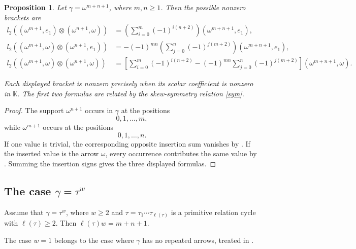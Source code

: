 \documentclass[11pt,a4paper,reqno]{amsart}
\newcommand{\mK}{\mathbb K}
\newcommand{\para}[2]{(#1,#2)}
\newcommand{\taue}{\tau_{\ell(\tau)}}
\theoremstyle{plain}
\newtheorem{proposition}[proposition]{Proposition}
\theoremstyle{definition}
\numberwithin{equation}{section}
\begin{document}
	\begin{proposition}
		\label{prop:higher-pure-loop-read-off}
		Let
		$\gamma=\omega^{m+n+1}$, where $m,n\geq1$.
		Then the possible nonzero brackets are
		\begin{align}
			l_2(
			\para{\omega^{m+1}}{e_1}
			\otimes
			\para{\omega^{n+1}}{\omega}
			)
			&=
			\left(
			\sum_{i=0}^{m}
			(-1)^{i(n+2)}
			\right)
			\para{\omega^{m+n+1}}{e_1},
			\label{eq:higher-loop-trivial-arrow}
			\\
			l_2(
			\para{\omega^{m+1}}{\omega}
			\otimes
			\para{\omega^{n+1}}{e_1}
			)
			&=
			-(-1)^{mn}
			\left(
			\sum_{j=0}^{n}
			(-1)^{j(m+2)}
			\right)
			\para{\omega^{m+n+1}}{e_1},
			\label{eq:higher-loop-arrow-trivial}
			\\
			l_2(
			\para{\omega^{m+1}}{\omega}
			\otimes
			\para{\omega^{n+1}}{\omega}
			)
			&=
			\left[
			\sum_{i=0}^{m}
			(-1)^{i(n+2)}
			-
			(-1)^{mn}
			\sum_{j=0}^{n}
			(-1)^{j(m+2)}
			\right]
			\para{\omega^{m+n+1}}{\omega}.
			\label{eq:higher-loop-arrow-arrow}
		\end{align}
		
		Each displayed bracket is nonzero precisely when its scalar coefficient is
		nonzero in $\mK$.  The first two formulas are related by the
		skew-symmetry relation \eqref{sym}.
	\end{proposition}
	
	\begin{proof}
		The support $\omega^{n+1}$ occurs in $\gamma$ at the positions
		\[
		0,1,\ldots,m,
		\]
		while $\omega^{m+1}$ occurs at the positions
		\[
		0,1,\ldots,n.
		\]
		If one value is trivial, the corresponding opposite insertion sum
		vanishes by .  If the inserted value is the
		arrow $\omega$, every occurrence contributes the same value by
		.  Summing the insertion signs gives the
		three displayed formulas.
	\end{proof}
	\subsection{The case \texorpdfstring{$\gamma=\tau^w$}{gamma = tau power w}}
	\label{sec:higher-power-cycle}
	Assume that $\gamma=\tau^w$, where $w\geq2$ and
	$\tau=\tau_1\cdots\taue$ is a primitive relation cycle with
	$\ell(\tau)\geq2$.  Then $\ell(\tau)w=m+n+1$.
	
	The case $w=1$ belongs to the case where $\gamma$ has no repeated arrows, treated in
	.
	
\end{document}
